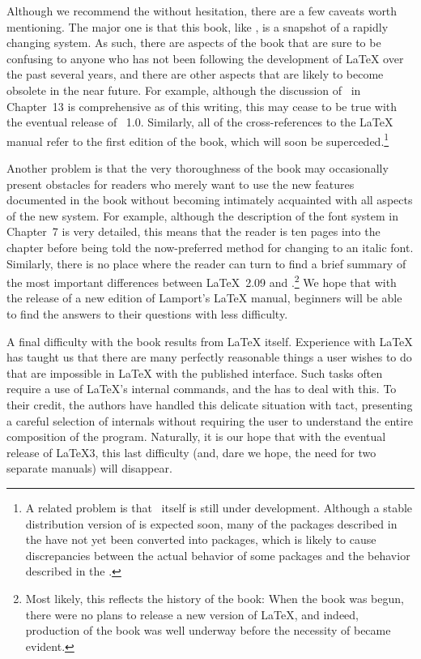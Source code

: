Although we recommend the  without hesitation,
there are a few caveats worth mentioning.  The major one is that this
book, like \LaTeXe, is a snapshot of a rapidly changing system.  As
such, there are aspects of the book that are sure to be confusing to
anyone who has not been following the development of \LaTeX{} over the
past several years, and there are other aspects that are likely to
become obsolete in the near future.  For example, although the
discussion of \BibTeX\ in Chapter~13 is comprehensive as of this
writing, this may cease to be true with the eventual release of
\BibTeX~1.0.  Similarly, all of the cross-references to the \LaTeX{}
manual refer to the first edition of the book, which will soon be
superceded.\footnote{A related  problem is that
\LaTeXe\ itself is still under development.  Although a stable
distribution version of \LaTeXe{} is expected soon, many of the
packages described in the  have not yet been
converted into \LaTeXe{} packages, which is likely to cause
discrepancies between the actual behavior of some packages and the
behavior described in the .}

Another problem is that the very thoroughness of the book may
occasionally present obstacles for readers who merely want to use the
new features documented in the book without becoming intimately
acquainted with all aspects of the new system.  For example, although
the description of the font system in Chapter~7 is very detailed, this
means that the reader is ten pages into the chapter before being told
the now-preferred method for changing to an italic font.  Similarly,
there is no place where the reader can turn to find a brief summary of
the most important differences between \LaTeX~2.09 and
\LaTeXe.\footnote{Most likely, this reflects the history of the book:
When the book was begun, there were no plans to release a new version
of \LaTeX, and indeed, production of the book was well underway before
the necessity of \LaTeXe{} became evident.} We hope that with the
release of a new edition of Lamport's \LaTeX{} manual, beginners will
be able to find the answers to their questions with less difficulty.

A final difficulty with the book results from \LaTeX{} itself.
Experience with \LaTeX{} has taught us that there are many perfectly
reasonable things a user wishes to do that are impossible in
\LaTeX{} with the published interface.  Such tasks often require a use
of \LaTeX's internal commands, and the  has to
deal with this.  To their credit, the authors have handled this
delicate situation with tact, presenting a careful selection of
internals without requiring the user to understand the entire
composition of the program.  Naturally, it is our hope that with the
eventual release of \LaTeX3, this last difficulty (and, dare we hope,
the need for two separate manuals) will disappear.


